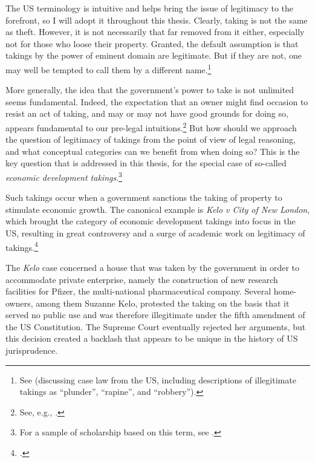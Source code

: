 The US terminology is intuitive and helps bring the issue of legitimacy to the forefront, so I will adopt it throughout this thesis. Clearly, taking is not the same as theft. However, it is not necessarily that far removed from it either, especially not for those who loose their property. Granted, the default assumption is that takings by the power of eminent domain are legitimate. But if they are not, one may well be tempted to call them by a different name.\footnote{See \cite[8-10]{gray11} (discussing case law from the US, including descriptions of illegitimate takings as ``plunder'', ``rapine'', and ``robbery'').}

More generally, the idea that the government's power to take is not unlimited seems fundamental. Indeed, the expectation that an owner might find occasion to resist an act of taking, and may or may not have good grounds for doing so, appears fundamental to our pre-legal intuitions.\footnote{See, e.g., \cite[159]{gray94}.} But how should we approach the question of legitimacy of takings from the point of view of legal reasoning, and what conceptual categories can we benefit from when doing so? This is the key question that is addressed in this thesis, for the special case of so-called {\it economic development takings}.\footnote{For a sample of scholarship based on this term, see \cite{cohen06,somin07,wilt09,yellin11}.}

Such takings occur when a government sanctions the taking of property to stimulate economic growth. The canonical example is {\it Kelo v City of New London}, which brought the category of economic development takings into focus in the US, resulting in great controversy and a surge of academic work on legitimacy of takings.\footcite{kelo05}

The {\it Kelo} case concerned a house that was taken by the government in order to accommodate private enterprise, namely the construction of new research facilities for Pfizer, the multi-national pharmaceutical company. Several home-owners, among them Suzanne Kelo, protested the taking on the basis that it served no public use and was therefore illegitimate under the fifth amendment of the US Constitution. The Supreme Court eventually rejected her arguments, but this decision created a backlash that appears to be unique in the history of US jurisprudence.

